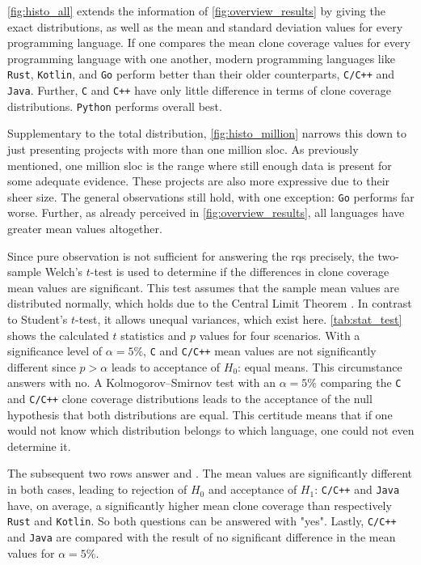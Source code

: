 \autoref{fig:histo_all} extends the information of \autoref{fig:overview_results} by giving the exact distributions, as well as the mean and standard deviation values for every programming language. If one compares the mean clone coverage values for every programming language with one another, modern programming languages like \texttt{Rust}, \texttt{Kotlin}, and \texttt{Go} perform better than their older counterparts, \texttt{C/C++} and \texttt{Java}. Further, \texttt{C} and \texttt{C++} have only little difference in terms of clone coverage distributions. \texttt{Python} performs overall best.

Supplementary to the total distribution, \autoref{fig:histo_million} narrows this down to just presenting projects with more than one million \acl{sloc}. As previously mentioned, one million \ac{sloc} is the range where still enough data is present for some adequate evidence. These projects are also more expressive due to their sheer size. The general observations still hold, with one exception: \texttt{Go} performs far worse. Further, as already perceived in \autoref{fig:overview_results}, all languages have greater mean values altogether.

Since pure observation is not sufficient for answering the \aclp{rq} precisely, the two-sample Welch's $t$-test is used to determine if the differences in clone coverage mean values are significant. This test assumes that the sample mean values are distributed normally, which holds due to the Central Limit Theorem \cite{shafer2022introductory}. In contrast to Student's $t$-test, it allows unequal variances, which exist here.
\autoref{tab:stat_test} shows the calculated $t$ statistics and $p$ values for four scenarios. With a significance level of $\alpha = 5\%$, \texttt{C} and \texttt{C/C++} mean values are not significantly different since $p > \alpha$ leads to acceptance of $H_0$: equal means. This circumstance answers  with no.
A Kolmogorov–Smirnov test with an $\alpha=5\%$ comparing the \texttt{C} and \texttt{C/C++} clone coverage distributions leads to the acceptance of the null hypothesis that both distributions are equal. This certitude means that if one would not know which distribution belongs to which language, one could not even determine it.

The subsequent two rows answer  and . The mean values are significantly different in both cases, leading to rejection of $H_0$ and acceptance of $H_1$: \texttt{C/C++} and \texttt{Java} have, on average, a significantly higher mean clone coverage than respectively \texttt{Rust} and \texttt{Kotlin}. So both questions can be answered with "yes".
Lastly, \texttt{C/C++} and \texttt{Java} are compared with the result of no significant difference in the mean values for $\alpha = 5\%$.

